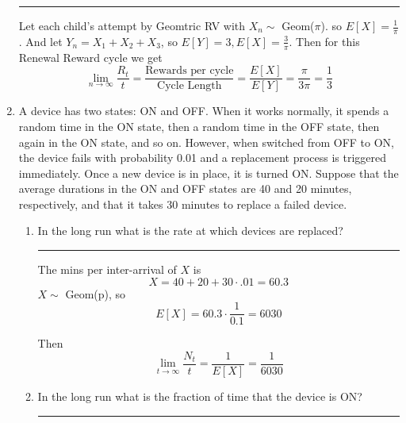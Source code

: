 \documentclass{article} %
\theoremstyle{plain}
\theoremstyle{case}
\begin{document}
\begin{enumerate}[label={\fbox{\textbf{Exercise \#\arabic* :}}}]
\par\noindent\rule{\textwidth}{0.1pt}
      Let each child's attempt by Geomtric RV with $X_n \sim $ Geom($\pi$).
    so $E[X] = \frac{1}{\pi}$.
    And let $Y_n = X_1 + X_2 + X_3$, so $E[Y] = 3, E[X] = \frac{3}{\pi}$. 
    Then for this Renewal Reward cycle we get
    \[ \lim_{n \to \infty} \frac{R_t}{t} =
        \frac{\text{Rewards per cycle}}{\text{Cycle Length}}
        = \frac{E[X]}{E[Y]}
        = \frac{\pi}{3 \pi} = \frac{1}{3}   \]
  \newpage
  \item A device has two states: ON and OFF. When it works normally, it
    spends a random time in the ON state, then a random time in the OFF
    state, then again in the ON state, and so on. However, when switched
    from OFF to ON, the device fails with probability 0.01 and a
    replacement process is triggered immediately. Once a new device is in
    place, it is turned ON. Suppose that the average durations in the ON
    and OFF states are 40 and 20 minutes, respectively, and that it takes
    30 minutes to replace a failed device.
    \begin{enumerate}
      \item In the long run what is the rate at which devices are replaced?
\par\noindent\rule{\textwidth}{0.1pt}
        The mins per inter-arrival of $X$ is
        \[ X = 40 + 20 + 30 \cdot .01 = 60.3 \]
        $X \sim$ Geom(p), so 
        \[ E[X] = 60.3 \cdot \frac{1}{0.1} = 6030 \]

        Then
        \[ \lim_{t \to \infty} \frac{N_t}{t} = \frac{1}{E[X]} =  \frac{1}{6030} \]
      \item In the long run what is the fraction of time that the device is ON?
\par\noindent\rule{\textwidth}{0.1pt}


\end{enumerate}
\end{enumerate}
\end{document}
